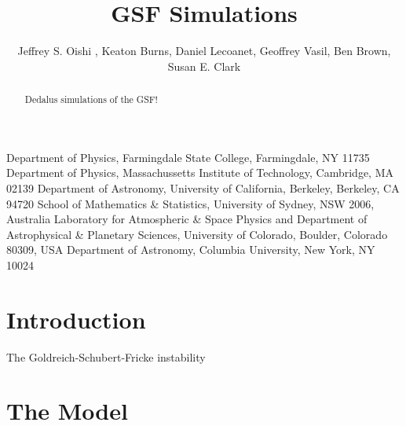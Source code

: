 \documentclass{jfm}
\begin{document}
\newtheorem{lemma}{Lemma}
\newtheorem{corollary}{Corollary}


\title{GSF Simulations}

\author
 {
 Jeffrey S. Oishi
  ,
  Keaton Burns,
  Daniel Lecoanet,
  Geoffrey Vasil,
  Ben Brown,
  Susan E. Clark
  }

\affiliation
{
Department of Physics, Farmingdale State College, Farmingdale, NY 11735
Department of Physics, Massachussetts Institute of Technology, Cambridge, MA 02139
Department of Astronomy, University of California, Berkeley, Berkeley, CA 94720
School of Mathematics \& Statistics, University of Sydney, NSW 2006, Australia
Laboratory for Atmospheric \& Space Physics and Department of Astrophysical \& Planetary Sciences, University of Colorado, Boulder, Colorado 80309, USA
Department of Astronomy, Columbia University, New York, NY 10024

}

\maketitle

\begin{abstract}
Dedalus simulations of the GSF!
\end{abstract}

\section{Introduction}
\label{sec:intro}
The Goldreich-Schubert-Fricke instability \citep{1967ApJ...150..571G}

\section{The Model}
\label{sec:model}
\end{document}
